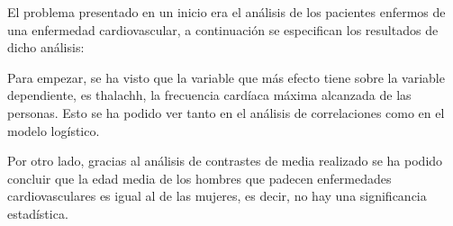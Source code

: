 \documentclass[
]{article}
\begin{document}
El problema presentado en un inicio era el análisis de los pacientes
enfermos de una enfermedad cardiovascular, a continuación se especifican
los resultados de dicho análisis:

Para empezar, se ha visto que la variable que más efecto tiene sobre la
variable dependiente, es thalachh, la frecuencia cardíaca máxima
alcanzada de las personas. Esto se ha podido ver tanto en el análisis de
correlaciones como en el modelo logístico.

Por otro lado, gracias al análisis de contrastes de media realizado se
ha podido concluir que la edad media de los hombres que padecen
enfermedades cardiovasculares es igual al de las mujeres, es decir, no
hay una significancia estadística.
\end{document}
